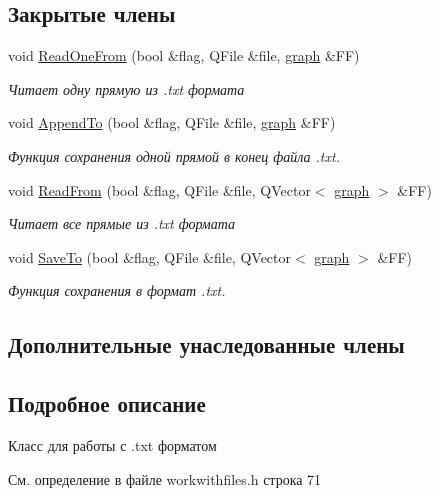 \subsection*{Закрытые члены}
\begin{DoxyCompactItemize}
\item 
void \hyperlink{class_txt_a1fa6a42957c0e72314c7ba70eb3fab76}{Read\+One\+From} (bool \&flag, Q\+File \&file, \hyperlink{classgraph}{graph} \&FF)
\begin{DoxyCompactList}\small\item\em Читает одну прямую из .txt формата \end{DoxyCompactList}\item 
void \hyperlink{class_txt_a4d23910d9b7f36e4f82fdf6045135378}{Append\+To} (bool \&flag, Q\+File \&file, \hyperlink{classgraph}{graph} \&FF)
\begin{DoxyCompactList}\small\item\em Функция сохранения одной прямой в конец файла .txt. \end{DoxyCompactList}\item 
void \hyperlink{class_txt_a2109a6bb72b2277dc5eb134a0f4f3257}{Read\+From} (bool \&flag, Q\+File \&file, Q\+Vector$<$ \hyperlink{classgraph}{graph} $>$ \&FF)
\begin{DoxyCompactList}\small\item\em Читает все прямые из .txt формата \end{DoxyCompactList}\item 
void \hyperlink{class_txt_abe4239811b140dd6fc5a439be6964aa0}{Save\+To} (bool \&flag, Q\+File \&file, Q\+Vector$<$ \hyperlink{classgraph}{graph} $>$ \&FF)
\begin{DoxyCompactList}\small\item\em Функция сохранения в формат .txt. \end{DoxyCompactList}\end{DoxyCompactItemize}
\subsection*{Дополнительные унаследованные члены}


\subsection{Подробное описание}
Класс для работы с .txt форматом 

См. определение в файле workwithfiles.\+h строка 71



